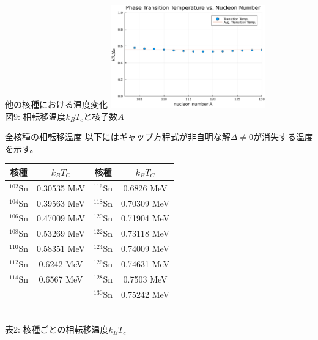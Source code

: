 \documentclass[aspectratio=169, 12pt, dvipdfmx]{beamer}
\begin{document}
\begin{frame}{他の核種における温度変化}
  \centering
  \includegraphics[width=0.5\textwidth]{fig_pdf/A_kT.pdf}
  \vspace{5pt} %
  \\
  \scriptsize 図9: 相転移温度$k_BT_c$と核子数$A$\\
\end{frame}

\begin{frame}{全核種の相転移温度}
  以下にはギャップ方程式が非自明な解\(\Delta \neq 0\)が消失する温度を示す。
  \centering
  \begin{tabular}{c|c || c|c}
    核種 & \(k_B T_C\) & 核種 & \(k_B T_C\) \\
    \hline
    $\mathrm{{}^{102}Sn}$ & 0.30535 MeV & $\mathrm{{}^{116}Sn}$ & 0.6826 MeV \\
    $\mathrm{{}^{104}Sn}$ & 0.39563 MeV & $\mathrm{{}^{118}Sn}$ & 0.70309 MeV \\
    $\mathrm{{}^{106}Sn}$ & 0.47009 MeV & $\mathrm{{}^{120}Sn}$ & 0.71904 MeV \\
    $\mathrm{{}^{108}Sn}$ & 0.53269 MeV & $\mathrm{{}^{122}Sn}$ & 0.73118 MeV \\
    $\mathrm{{}^{110}Sn}$ & 0.58351 MeV & $\mathrm{{}^{124}Sn}$ & 0.74009 MeV \\
    $\mathrm{{}^{112}Sn}$ & 0.6242 MeV & $\mathrm{{}^{126}Sn}$ & 0.74631 MeV \\
    $\mathrm{{}^{114}Sn}$ & 0.6567 MeV & $\mathrm{{}^{128}Sn}$ & 0.7503 MeV \\
    & & $\mathrm{{}^{130}Sn}$ & 0.75242 MeV
  \end{tabular}
  \vspace{5pt}\\
  \scriptsize 表2: 核種ごとの相転移温度$k_B T_c$\\
\end{frame}
\end{document}
